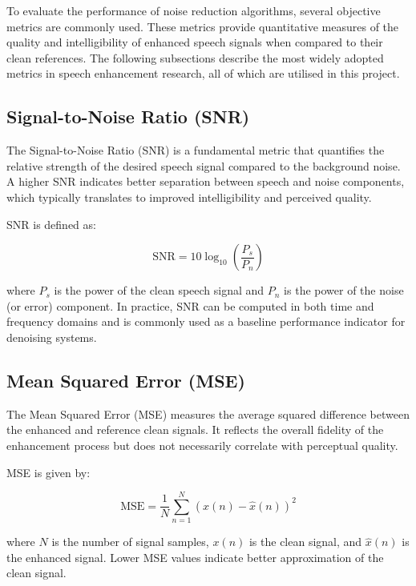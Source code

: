 To evaluate the performance of noise reduction algorithms, several objective metrics are commonly used. These metrics provide quantitative measures of the quality and intelligibility of enhanced speech signals when compared to their clean references. The following subsections describe the most widely adopted metrics in speech enhancement research, all of which are utilised in this project.

\subsection{Signal-to-Noise Ratio (SNR)}
\label{subsec:snr}

The Signal-to-Noise Ratio (SNR) is a fundamental metric that quantifies the relative strength of the desired speech signal compared to the background noise. A higher SNR indicates better separation between speech and noise components, which typically translates to improved intelligibility and perceived quality.

SNR is defined as:

\begin{equation}
    \text{SNR} = 10 \log_{10} \left( \frac{P_s}{P_n} \right)
\end{equation}

where \( P_s \) is the power of the clean speech signal and \( P_n \) is the power of the noise (or error) component. In practice, SNR can be computed in both time and frequency domains and is commonly used as a baseline performance indicator for denoising systems.

\subsection{Mean Squared Error (MSE)}
\label{subsec:mse}

The Mean Squared Error (MSE) measures the average squared difference between the enhanced and reference clean signals. It reflects the overall fidelity of the enhancement process but does not necessarily correlate with perceptual quality.

MSE is given by:

\begin{equation}
    \text{MSE} = \frac{1}{N} \sum_{n=1}^{N} (x(n) - \hat{x}(n))^2
\end{equation}

where \( N \) is the number of signal samples, \( x(n) \) is the clean signal, and \( \hat{x}(n) \) is the enhanced signal. Lower MSE values indicate better approximation of the clean signal.

